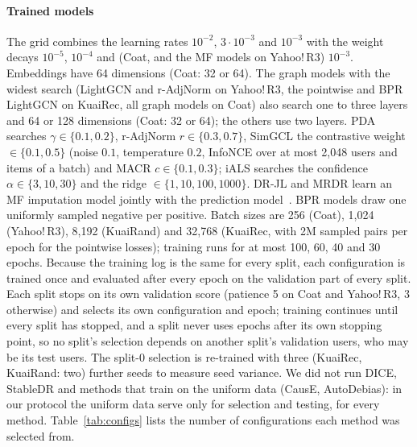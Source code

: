 \documentclass[preprint,review,12pt,authoryear]{elsarticle}
\theoremstyle{definition}
\begin{document}
\paragraph{Trained models}
The grid combines the learning rates $10^{-2}$, $3\cdot10^{-3}$ and $10^{-3}$ with the
weight decays $10^{-5}$, $10^{-4}$ and (Coat, and the MF models on Yahoo!\,R3)
$10^{-3}$. Embeddings have 64 dimensions (Coat: 32 or 64). The graph models with
the widest search (LightGCN and r-AdjNorm on Yahoo!\,R3, the pointwise
and BPR LightGCN on KuaiRec, all graph models on Coat) also search one to three
layers and 64 or 128 dimensions (Coat: 32 or 64); the others use two layers.
PDA searches $\gamma\in\{0.1,0.2\}$, r-AdjNorm $r\in\{0.3,0.7\}$, SimGCL the
contrastive weight $\in\{0.1,0.5\}$ (noise $0.1$, temperature $0.2$, InfoNCE over at
most 2{,}048 users and items of a batch) and MACR $c\in\{0.1,0.3\}$; iALS searches
the confidence $\alpha\in\{3,10,30\}$ and the ridge $\in\{1,10,100,1000\}$. DR-JL and MRDR
learn an MF imputation model jointly with the prediction
model~\citep{wang2019drjl,guo2021mrdr}. BPR models draw one uniformly sampled
negative per positive. Batch sizes are 256 (Coat), 1{,}024 (Yahoo!\,R3), 8{,}192
(KuaiRand) and 32{,}768 (KuaiRec, with 2M sampled pairs per epoch for the
pointwise losses); training runs for at most 100, 60, 40 and 30 epochs. Because
the training log is the same for every split, each configuration is trained
once and evaluated after every epoch on the validation part of every split.
Each split stops on its own validation score (patience 5 on Coat and
Yahoo!\,R3, 3 otherwise) and selects its own configuration and epoch; training
continues until every split has stopped, and a split never uses epochs after
its own stopping point, so no split's selection depends on another split's
validation users, who may be its test users. The split-0 selection is
re-trained with three (KuaiRec, KuaiRand: two) further seeds to measure seed
variance. We did not run DICE, StableDR and methods that train on the uniform
data (CausE, AutoDebias): in our protocol the uniform data serve only for
selection and testing, for every method. Table~\ref{tab:configs} lists the
number of configurations each method was selected from.

\begin{table}[h]\centering\footnotesize
\caption{Number of configurations searched per method (per split).}\label{tab:configs}

\end{table}
\end{document}
